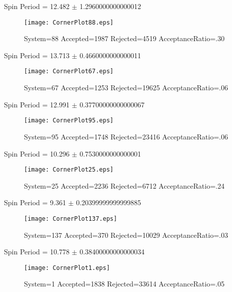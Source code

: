 \documentclass[10pt]{article}
\begin{document}
\newpage
\begin{center}
        Spin Period = 12.482 $\pm$ 1.2960000000000012
        \end{center}
\begin{figure}[H] 
        \texttt{[image: CornerPlot88.eps]}
        \caption{System=88 Accepted=1987 Rejected=4519 AcceptanceRatio=.30}
        \label{S88}
        \centering
        \end{figure}
\newpage
\begin{center}
        Spin Period = 13.713 $\pm$ 0.4660000000000011
        \end{center}
\begin{figure}[H] 
        \texttt{[image: CornerPlot67.eps]}
        \caption{System=67 Accepted=1253 Rejected=19625 AcceptanceRatio=.06}
        \label{S67}
        \centering
        \end{figure}
\newpage
\begin{center}
        Spin Period = 12.991 $\pm$ 0.37700000000000067
        \end{center}
\begin{figure}[H] 
        \texttt{[image: CornerPlot95.eps]}
        \caption{System=95 Accepted=1748 Rejected=23416 AcceptanceRatio=.06}
        \label{S95}
        \centering
        \end{figure}
\newpage
\begin{center}
        Spin Period = 10.296 $\pm$ 0.7530000000000001
        \end{center}
\begin{figure}[H] 
        \texttt{[image: CornerPlot25.eps]}
        \caption{System=25 Accepted=2236 Rejected=6712 AcceptanceRatio=.24}
        \label{S25}
        \centering
        \end{figure}
\newpage
\begin{center}
        Spin Period = 9.361 $\pm$ 0.20399999999999885
        \end{center}
\begin{figure}[H] 
        \texttt{[image: CornerPlot137.eps]}
        \caption{System=137 Accepted=370 Rejected=10029 AcceptanceRatio=.03}
        \label{S137}
        \centering
        \end{figure}
\newpage
\begin{center}
        Spin Period = 10.778 $\pm$ 0.38400000000000034
        \end{center}
\begin{figure}[H] 
        \texttt{[image: CornerPlot1.eps]}
        \caption{System=1 Accepted=1838 Rejected=33614 AcceptanceRatio=.05}
        \label{S1}
        \centering
        \end{figure}
\end{document}
